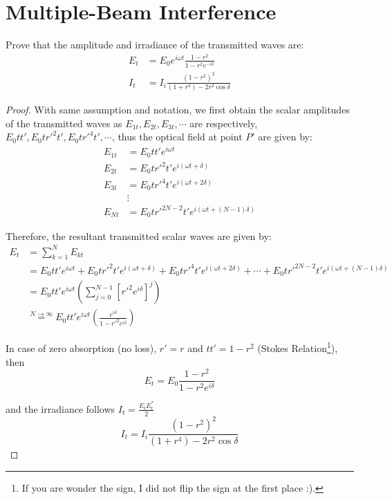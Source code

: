 \documentclass[openany]{book}
\begin{document}
\section{Multiple-Beam Interference}
Prove that the amplitude and irradiance of the transmitted waves are:
\begin{align*}
E_t&=E_0e^{i\omega t}\frac{1-r^2}{1-r^2e^{-i\delta }}\\
I_t&=I_i\frac{(1-r^2)^2}{(1+r^4)-2r^2\cos \delta}
\end{align*}
\begin{proof}
With same assumption and notation, we first obtain the scalar amplitudes of the transmitted waves as $E_{1t}, E_{2t}, E_{3t},\cdots$ are respectively, $E_0tt',E_0tr'^2t',E_0tr'^4t',\cdots $, thus the optical field at point $P'$ are given by:
\begin{align*}
E_{1t}&=E_0tt'e^{i\omega t}\\
E_{2t}&=E_0tr'^2t'e^{i(\omega t+\delta )}\\
E_{3t}&=E_0tr'^4t'e^{i(\omega t+2\delta )}\\
&\vdots\\
E_{Nt}&=E_0tr'^{2N-2}t'e^{i(\omega t+(N-1)\delta )}
\end{align*}

Therefore, the resultant transmitted scalar waves are given by:
\begin{align*}
E_t&=\sum _{k=1}^{N}E_{kt}\\
&=E_0tt'e^{i\omega t}+E_0tr'^2t'e^{i(\omega t+\delta )}+E_0tr'^4t'e^{i(\omega t+2\delta )}+\cdots +E_0tr'^{2N-2}t'e^{i(\omega t+(N-1)\delta )}\\
&=E_0tt'e^{i\omega t}\left(\sum _{j=0}^{N-1}\left[r'^2e^{i\delta }\right]^j\right)\\
&\overset{N\to \infty}{=}E_0tt'e^{i\omega t}\left(\frac{e^{i\delta }}{1-r'^2e^{i\delta }}\right)
\end{align*}

In case of zero absorption (no loss), $r'=r$ and $tt'=1-r^2$ (Stokes Relation\footnote{If you are wonder the sign, I did not flip the sign at the first place :).}), then
\[E_t=E_0\frac{1-r^2}{1-r^2e^{i\delta }}\]

and the irradiance follows $I_t=\frac{E_tE_t^*}{2}$
\[I_t=I_i\frac{(1-r^2)^2}{(1+r^4)-2r^2\cos \delta}\]
\end{proof}
\printindex
\end{document}
